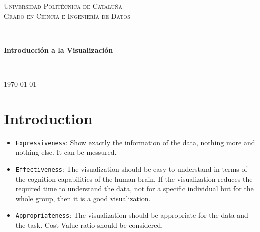 \documentclass{article}
\begin{document}
\begin{titlepage}
    \newcommand{\HRule}{\rule{\linewidth}{0.5mm}}
    
    \center %
    \textsc{\LARGE Universidad Politécnica de Cataluña}\\[1.5cm]
    \textsc{\Large Grado en Ciencia e Ingeniería de Datos}\\[0.5cm]
    \HRule\\[0.4cm]
    {\huge\bfseries Introducción a la Visualización}\\[0.4cm]
    \HRule\\[1.5cm]
    \vfill
    {\large\today}
\end{titlepage}

\newpage
\tableofcontents
\newpage

\fancyfoot{} %

\section{Introduction}

\begin{itemize}
  \item \texttt{Expressiveness}: Show exactly the information of the data, nothing more and nothing else. It can be messured.
  \item \texttt{Effectiveness}: The visualization should be easy to understand in terms of the cognition capabilities of the human brain.  If the visualization reduces the required time to understand the data, not for a specific individual but for the whole group, then it is a good visualization.
  \item \texttt{Appropriateness}: The visualization should be appropriate for the data and the task. Cost-Value ratio should be considered.
\end{itemize}



\newpage
\end{document}
